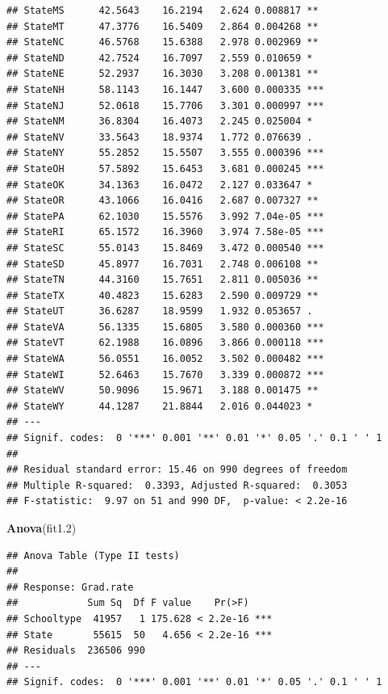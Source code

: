 \documentclass[]{article}
\newenvironment{Shaded}{\begin{snugshade}}{\end{snugshade}}
\newcommand{\KeywordTok}[1]{\textcolor[rgb]{0.13,0.29,0.53}{\textbf{#1}}}
\newcommand{\DecValTok}[1]{\textcolor[rgb]{0.00,0.00,0.81}{#1}}
\newcommand{\NormalTok}[1]{#1}
\begin{document}
\begin{verbatim}
## StateMS      42.5643    16.2194   2.624 0.008817 ** 
## StateMT      47.3776    16.5409   2.864 0.004268 ** 
## StateNC      46.5768    15.6388   2.978 0.002969 ** 
## StateND      42.7524    16.7097   2.559 0.010659 *  
## StateNE      52.2937    16.3030   3.208 0.001381 ** 
## StateNH      58.1143    16.1447   3.600 0.000335 ***
## StateNJ      52.0618    15.7706   3.301 0.000997 ***
## StateNM      36.8304    16.4073   2.245 0.025004 *  
## StateNV      33.5643    18.9374   1.772 0.076639 .  
## StateNY      55.2852    15.5507   3.555 0.000396 ***
## StateOH      57.5892    15.6453   3.681 0.000245 ***
## StateOK      34.1363    16.0472   2.127 0.033647 *  
## StateOR      43.1066    16.0416   2.687 0.007327 ** 
## StatePA      62.1030    15.5576   3.992 7.04e-05 ***
## StateRI      65.1572    16.3960   3.974 7.58e-05 ***
## StateSC      55.0143    15.8469   3.472 0.000540 ***
## StateSD      45.8977    16.7031   2.748 0.006108 ** 
## StateTN      44.3160    15.7651   2.811 0.005036 ** 
## StateTX      40.4823    15.6283   2.590 0.009729 ** 
## StateUT      36.6287    18.9599   1.932 0.053657 .  
## StateVA      56.1335    15.6805   3.580 0.000360 ***
## StateVT      62.1988    16.0896   3.866 0.000118 ***
## StateWA      56.0551    16.0052   3.502 0.000482 ***
## StateWI      52.6463    15.7670   3.339 0.000872 ***
## StateWV      50.9096    15.9671   3.188 0.001475 ** 
## StateWY      44.1287    21.8844   2.016 0.044023 *  
## ---
## Signif. codes:  0 '***' 0.001 '**' 0.01 '*' 0.05 '.' 0.1 ' ' 1
## 
## Residual standard error: 15.46 on 990 degrees of freedom
## Multiple R-squared:  0.3393, Adjusted R-squared:  0.3053 
## F-statistic:  9.97 on 51 and 990 DF,  p-value: < 2.2e-16
\end{verbatim}

\begin{Shaded}
\begin{Highlighting}[]
\KeywordTok{Anova}\NormalTok{(fit1.}\DecValTok{2}\NormalTok{)}
\end{Highlighting}
\end{Shaded}

\begin{verbatim}
## Anova Table (Type II tests)
## 
## Response: Grad.rate
##            Sum Sq  Df F value    Pr(>F)    
## Schooltype  41957   1 175.628 < 2.2e-16 ***
## State       55615  50   4.656 < 2.2e-16 ***
## Residuals  236506 990                      
## ---
## Signif. codes:  0 '***' 0.001 '**' 0.01 '*' 0.05 '.' 0.1 ' ' 1
\end{verbatim}
\end{document}
